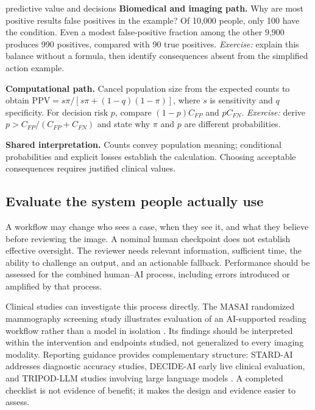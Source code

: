 \documentclass[11pt,a4paper]{article}
\begin{document}
\begin{perspectives}{predictive value and decisions}
\textbf{Biomedical and imaging path.} Why are most positive results false positives in the example? Of 10,000 people, only 100 have the condition. Even a modest false-positive fraction among the other 9,900 produces 990 positives, compared with 90 true positives. \emph{Exercise:} explain this balance without a formula, then identify consequences absent from the simplified action example.

\textbf{Computational path.} Cancel population size from the expected counts to obtain $\mathrm{PPV}=s\pi/[s\pi+(1-q)(1-\pi)]$, where $s$ is sensitivity and $q$ specificity. For decision risk $p$, compare $(1-p)C_{FP}$ and $pC_{FN}$. \emph{Exercise:} derive $p>C_{FP}/(C_{FP}+C_{FN})$ and state why $\pi$ and $p$ are different probabilities.

\textbf{Shared interpretation.} Counts convey population meaning; conditional probabilities and explicit losses establish the calculation. Choosing acceptable consequences requires justified clinical values.
\end{perspectives}

\subsection{Evaluate the system people actually use}
A workflow may change who sees a case, when they see it, and what they believe before reviewing the image. A nominal human checkpoint does not establish effective oversight. The reviewer needs relevant information, sufficient time, the ability to challenge an output, and an actionable fallback. Performance should be assessed for the combined human--AI process, including errors introduced or amplified by that process.

Clinical studies can investigate this process directly. The MASAI randomized mammography screening study illustrates evaluation of an AI-supported reading workflow rather than a model in isolation \citep{masai2023}. Its findings should be interpreted within the intervention and endpoints studied, not generalized to every imaging modality. Reporting guidance provides complementary structure: STARD-AI addresses diagnostic accuracy studies, DECIDE-AI early live clinical evaluation, and TRIPOD-LLM studies involving large language models \citep{stard2025,decide2022,gallifant2025}. A completed checklist is not evidence of benefit; it makes the design and evidence easier to assess.
\end{document}
